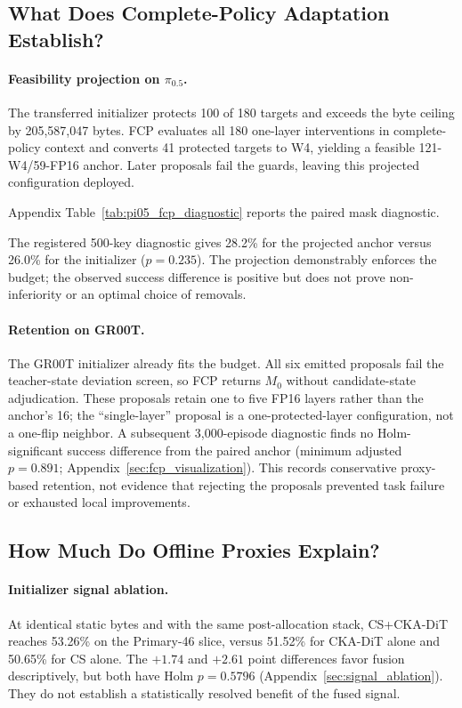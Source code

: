 \subsection{What Does Complete-Policy Adaptation Establish?}
\label{sec:pi05_fcp_main}

\paragraph{Feasibility projection on $\pi_{0.5}$.}
The transferred initializer protects 100 of 180 targets and exceeds the byte ceiling by 205,587,047 bytes. FCP evaluates all 180 one-layer interventions in complete-policy context and converts 41 protected targets to W4, yielding a feasible 121-W4/59-FP16 anchor. Later proposals fail the guards, leaving this projected configuration deployed.

Appendix Table~\ref{tab:pi05_fcp_diagnostic} reports the paired mask diagnostic.

The registered 500-key diagnostic gives 28.2\% for the projected anchor versus 26.0\% for the initializer ($p=0.235$). The projection demonstrably enforces the budget; the observed success difference is positive but does not prove non-inferiority or an optimal choice of removals.

\paragraph{Retention on GR00T.}
The GR00T initializer already fits the budget. All six emitted proposals fail the teacher-state deviation screen, so FCP returns $M_0$ without candidate-state adjudication. These proposals retain one to five FP16 layers rather than the anchor's 16; the ``single-layer'' proposal is a one-protected-layer configuration, not a one-flip neighbor. A subsequent 3,000-episode diagnostic finds no Holm-significant success difference from the paired anchor (minimum adjusted $p=0.891$; Appendix~\ref{sec:fcp_visualization}). This records conservative proxy-based retention, not evidence that rejecting the proposals prevented task failure or exhausted local improvements.

\subsection{How Much Do Offline Proxies Explain?}

\paragraph{Initializer signal ablation.}
At identical static bytes and with the same post-allocation stack, CS+CKA-DiT reaches 53.26\% on the Primary-46 slice, versus 51.52\% for CKA-DiT alone and 50.65\% for CS alone. The $+1.74$ and $+2.61$ point differences favor fusion descriptively, but both have Holm $p=0.5796$ (Appendix~\ref{sec:signal_ablation}). They do not establish a statistically resolved benefit of the fused signal.


